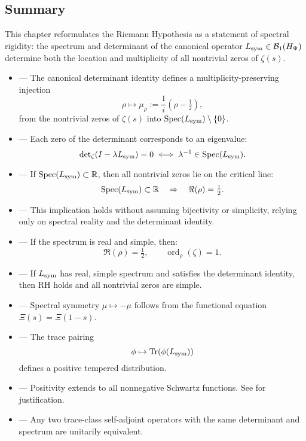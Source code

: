 \subsection*{Summary}

This chapter reformulates the Riemann Hypothesis as a statement of spectral rigidity: the spectrum and determinant of the canonical operator \( L_{\mathrm{sym}} \in \mathcal{B}_1(H_{\Psi}) \) determine both the location and multiplicity of all nontrivial zeros of \( \zeta(s) \).

\begin{itemize}
  \item {} — The canonical determinant identity defines a multiplicity-preserving injection
  \[
  \rho \mapsto \mu_\rho := \frac{1}{i}(\rho - \tfrac{1}{2}),
  \]
  from the nontrivial zeros of \( \zeta(s) \) into \( \operatorname{Spec}(L_{\mathrm{sym}}) \setminus \{0\} \).

  \item {} — Each zero of the determinant corresponds to an eigenvalue:
  \[
  \det\nolimits_{\zeta}(I - \lambda L_{\mathrm{sym}}) = 0 \iff \lambda^{-1} \in \operatorname{Spec}(L_{\mathrm{sym}}).
  \]

  \item {} — If \( \operatorname{Spec}(L_{\mathrm{sym}}) \subset \mathbb{R} \), then all nontrivial zeros lie on the critical line:
  \[
  \operatorname{Spec}(L_{\mathrm{sym}}) \subset \mathbb{R} \quad \Rightarrow \quad \Re(\rho) = \tfrac{1}{2}.
  \]

  \item {} — This implication holds without assuming bijectivity or simplicity, relying only on spectral reality and the determinant identity.

  \item {} — If the spectrum is real and simple, then:
  \[
  \Re(\rho) = \tfrac{1}{2}, \qquad \operatorname{ord}_\rho(\zeta) = 1.
  \]

  \item {} — If \( L_{\mathrm{sym}} \) has real, simple spectrum and satisfies the determinant identity, then RH holds and all nontrivial zeros are simple.

  \item {} — Spectral symmetry \( \mu \mapsto -\mu \) follows from the functional equation \( \Xi(s) = \Xi(1 - s) \).

  \item {} — The trace pairing
  \[
  \phi \mapsto \operatorname{Tr}(\phi(L_{\mathrm{sym}}))
  \]
  defines a positive tempered distribution.

  \item {} — Positivity extends to all nonnegative Schwartz functions. See  for justification.

  \item {} — Any two trace-class self-adjoint operators with the same determinant and spectrum are unitarily equivalent.
\end{itemize}

